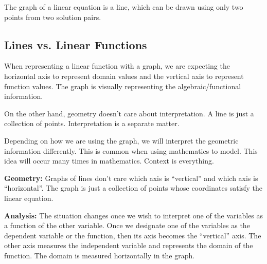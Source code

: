\documentclass{ximera}
\begin{document}
\begin{example}
\begin{image}
\end{image}

The graph of a linear equation is a line, which can be drawn using only two points from two solution pairs.






\end{example}










\subsection*{Lines vs. Linear Functions}


When representing a linear function with a graph, we are expecting the horizontal axis to represent domain values and the vertical axis to represent function values. The graph is visually representing the algebraic/functional information. 



On the other hand, geometry doesn't care about interpretation. A line is just a collection of points. Interpretation is a separate matter.


Depending on how we are using the graph, we will interpret the geometric information differently.  This is common when using mathematics to model. This idea will occur many times in mathematics. Context is everything.


\textbf{\textcolor{purple!85!blue}{Geometry:}} Graphs of lines don't care which axis is ``vertical'' and which axis is ``horizontal''.  The graph is just a collection of points whose coordinates satisfy the linear equation.  

\textbf{\textcolor{purple!85!blue}{Analysis:}} The situation changes once we wish to interpret one of the variables as a function of the other variable. Once we designate one of the variables as the dependent variable or the function, then its axis becomes the ``vertical'' axis.  The other axis measures the independent variable and represents the domain of the function. The domain is measured horizontally in the graph. 
\end{document}
